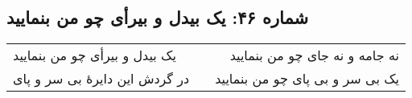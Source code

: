 \begin{center}
\section*{شماره ۴۶: یک بیدل و بیرأی چو من بنمایید}
\label{sec:046}
\begin{longtable}{l p{0.5cm} r}
یک بیدل و بیرأی چو من بنمایید
&&
نه جامه و نه جای چو من بنمایید
\\
در گردش این دایرهٔ بی سر و پای
&&
یک بی سر و بی پای چو من بنمایید
\\
\end{longtable}
\end{center}
